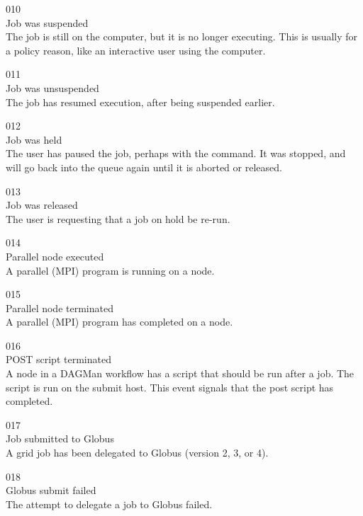 \noindent{} 010 \\
 Job was suspended \\
 The job is still on the computer, but it is no longer
executing. 
This is usually for a policy reason, like an interactive user using
the computer. 

\noindent{} 011 \\
 Job was unsuspended \\
 The job has resumed execution, after being
suspended earlier. 

\noindent{} 012 \\
 Job was held \\
 The user has paused the job, perhaps with
the  command.
It was stopped, and will go back into the queue again until it is
aborted or released. 

\noindent{} 013 \\
 Job was released \\
 The user is requesting that a job on hold be re-run.

\noindent{} 014 \\
 Parallel node executed \\
 A parallel (MPI) program is running on a node.

\noindent{} 015 \\
 Parallel node terminated \\
 A parallel (MPI) program has completed on a node.

\noindent{} 016 \\
 POST script terminated \\
 A node in a DAGMan workflow has a script
that should be run after a job. 
The script is run on the submit host. 
This event signals that the post script has completed.

\noindent{} 017 \\
 Job submitted to Globus \\
 A grid job has been delegated to Globus
(version 2, 3, or 4).

\noindent{} 018 \\
 Globus submit failed \\
 The attempt to delegate a job to Globus
failed. 

